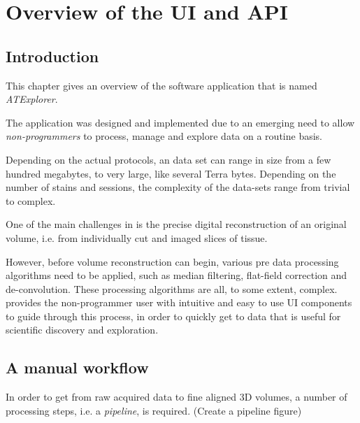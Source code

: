 
\chapter{Overview of the \ate{} UI and API}
\section{Introduction}

\doublespacing
This chapter gives an overview of the software application that is named \emph{ATExplorer}.

The \ate application was designed and implemented due to an emerging need to allow \emph{non-programmers} to process, manage and explore \at data on a routine basis.

Depending on the actual protocols, an \at data set can range in size from a few hundred megabytes, to very large, like several Terra bytes.  Depending on the number of stains and sessions, the complexity of the data-sets range from trivial to complex.

One of the main challenges in \at is the precise digital reconstruction of an original volume, i.e. from individually cut and imaged slices of tissue.

However, before volume reconstruction can begin, various pre data processing algorithms need to be applied, such as median filtering, flat-field correction and de-convolution. These processing algorithms are all, to some extent, complex. \ate provides the non-programmer user with intuitive and easy to use UI components to guide through this process, in order to quickly get to data that is useful for scientific discovery and exploration.

\section{A manual \at workflow}
In order to get from raw acquired data to fine aligned 3D volumes, a number of processing steps, i.e. a \emph{pipeline}, is required. (Create a pipeline figure)

\begin{description}[font=$\bullet$~\normalfont\scshape\color{red!50!black}]
\item [FlatField correction]
\item [Deconvolution]
\item [Stitching]
\item [Registration]
\item [Rough aligning] 
\item [Fine aligning] 
\item [Other]
\end{description}

